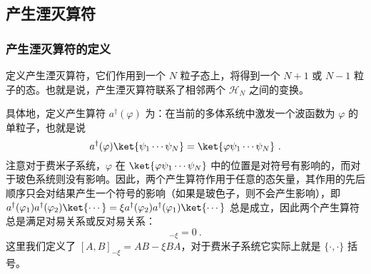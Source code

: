 \subsection{产生湮灭算符}
\subsubsection{产生湮灭算符的定义}
定义产生湮灭算符，它们作用到一个 $N$ 粒子态上，将得到一个 $N+1$ 或 $N-1$ 粒子的态。也就是说，产生湮灭算符联系了相邻两个 $\mathcal{H}_N$ 之间的变换。

具体地，定义产生算符 $a^\dagger(\varphi)$ 为：在当前的多体系统中激发一个波函数为 $\varphi$ 的单粒子，也就是说
\begin{equation}\label{eq_SecQua_3}
a^\dagger(\varphi)\ket{\psi_1\cdots\psi_N}=\ket{\varphi\psi_1\cdots\psi_N}~.
\end{equation}
注意对于费米子系统，$\varphi$ 在 $\ket{\varphi\psi_1\cdots\psi_N}$ 中的位置是对符号有影响的，而对于玻色系统则没有影响。因此，两个产生算符作用于任意的态矢量，其作用的先后顺序只会对结果产生一个符号的影响（如果是玻色子，则不会产生影响），即 $a^\dagger(\varphi_1)a^\dagger(\varphi_2)\ket{\cdots}=\xi a^\dagger(\varphi_2)a^\dagger(\varphi_1)\ket{\cdots}$ 总是成立，因此两个产生算符总是满足对易关系或反对易关系：
\begin{equation}
[a^\dagger(\varphi_1),a^\dagger(\varphi_2)]_{-\xi}=0~.
\end{equation}
这里我们定义了 $[A,B]_{-\xi}=AB-\xi BA$，对于费米子系统它实际上就是 $\{\cdot,\cdot \}$ 括号。

